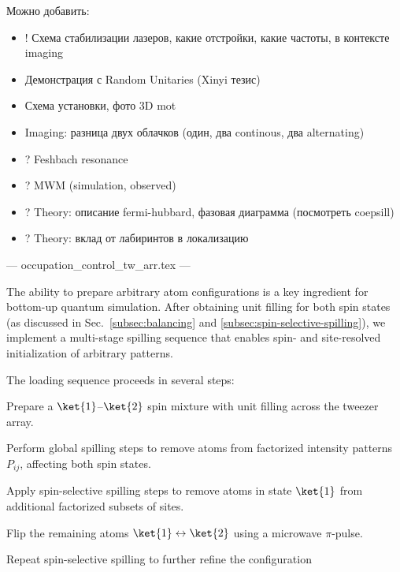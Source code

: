 Можно добавить:
\begin{itemize}
	\item ! Схема стабилизации лазеров, какие отстройки, какие частоты, в контексте imaging
	\item Демонстрация с Random Unitaries (Xinyi тезис)
	\item Схема установки, фото 3D mot
	\item Imaging: разница двух облачков (один, два continous, два alternating)
	\item ? Feshbach resonance
	\item ? MWM (simulation, observed)
	\item ? Theory: описание fermi-hubbard, фазовая диаграмма (посмотреть coepsill)
	\item ? Theory: вклад от лабиринтов в локализацию
\end{itemize}








--- occupation_control_tw_arr.tex ---

The ability to prepare arbitrary atom configurations is a key ingredient for bottom-up quantum simulation. After obtaining unit filling for both spin states (as discussed in Sec.~\ref{subsec:balancing} and \ref{subsec:spin-selective-spilling}), we implement a multi-stage spilling sequence that enables spin- and site-resolved initialization of arbitrary patterns.

The loading sequence proceeds in several steps:
\begin{enumerate*}
    \item Prepare a $\ket{1}$–$\ket{2}$ spin mixture with unit filling across the tweezer array.
    \item Perform global spilling steps to remove atoms from factorized intensity patterns $P_{ij}$, affecting both spin states.
    \item Apply spin-selective spilling steps to remove atoms in state $\ket{1}$ from additional factorized subsets of sites.
    \item Flip the remaining atoms $\ket{1} \leftrightarrow \ket{2}$ using a microwave $\pi$-pulse.
    \item Repeat spin-selective spilling to further refine the configuration
\end{enumerate*}

